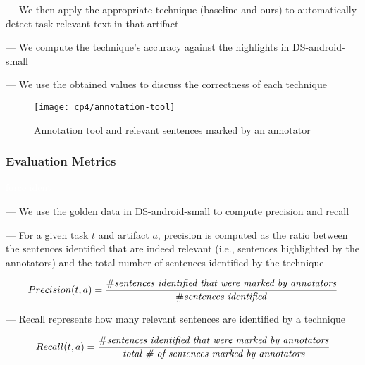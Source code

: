 --- We then apply the appropriate technique (baseline and ours) to automatically detect task-relevant text in that artifact


--- We compute the technique's accuracy against the highlights in \acs{DS-android-small}

--- We use the obtained values to discuss the correctness of each technique



\begin{figure}
    \centering
    \texttt{[image: cp4/annotation-tool]}
    \caption{Annotation tool and relevant sentences marked by an annotator}
    \label{fig:corpus-annotation-tool}
\end{figure}



\subsubsection{Evaluation Metrics}
\textcolor{white}{force ident} %

--- We use the golden data in \acs{DS-android-small} to compute precision and recall


--- For a given task $t$ and artifact $a$, precision is computed as the ratio between the sentences identified that are indeed relevant (i.e., sentences highlighted by the annotators) and the total number of sentences identified by the technique


\begin{equation}
    Precision(t, a) = \frac{\# \text{\textit{sentences identified that were marked by annotators}}}{\# \text{\textit{sentences identified}}}
\end{equation}

\vspace{3mm}

--- Recall represents how many relevant sentences are identified by a technique


\begin{equation}
    Recall(t, a) = \frac{\# \text{\textit{sentences identified that were marked by annotators}}}{\text{\textit{total \# of sentences marked by annotators}}}
\end{equation}

\vspace{3mm}

